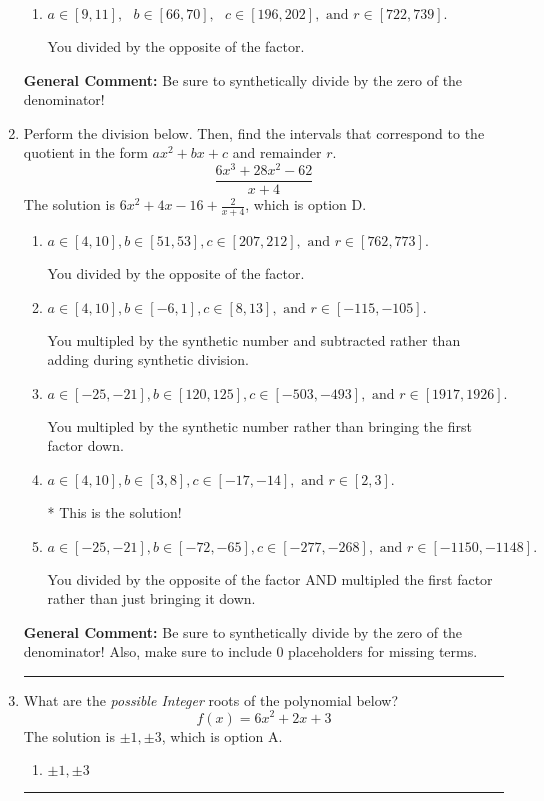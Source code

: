 \documentclass{extbook}[14pt]
\newcommand{\litem}[1]{\item #1

\rule{\textwidth}{0.4pt}}
\begin{document}
\begin{enumerate}
{\begin{enumerate}[label=\Alph*.]
* This is the solution!
\item \( a \in [9, 11], \text{   } b \in [66, 70], \text{   } c \in [196, 202], \text{   and   } r \in [722, 739]. \)

 You divided by the opposite of the factor.
\end{enumerate}

\textbf{General Comment:} Be sure to synthetically divide by the zero of the denominator!
}
\litem{
Perform the division below. Then, find the intervals that correspond to the quotient in the form $ax^2+bx+c$ and remainder $r$.
\[ \frac{6x^{3} +28 x^{2} -62}{x + 4} \]The solution is \( 6x^{2} +4 x -16 + \frac{2}{x + 4} \), which is option D.\begin{enumerate}[label=\Alph*.]
\item \( a \in [4, 10], b \in [51, 53], c \in [207, 212], \text{ and } r \in [762, 773]. \)

 You divided by the opposite of the factor.
\item \( a \in [4, 10], b \in [-6, 1], c \in [8, 13], \text{ and } r \in [-115, -105]. \)

 You multipled by the synthetic number and subtracted rather than adding during synthetic division.
\item \( a \in [-25, -21], b \in [120, 125], c \in [-503, -493], \text{ and } r \in [1917, 1926]. \)

 You multipled by the synthetic number rather than bringing the first factor down.
\item \( a \in [4, 10], b \in [3, 8], c \in [-17, -14], \text{ and } r \in [2, 3]. \)

* This is the solution!
\item \( a \in [-25, -21], b \in [-72, -65], c \in [-277, -268], \text{ and } r \in [-1150, -1148]. \)

 You divided by the opposite of the factor AND multipled the first factor rather than just bringing it down.
\end{enumerate}

\textbf{General Comment:} Be sure to synthetically divide by the zero of the denominator! Also, make sure to include 0 placeholders for missing terms.
}
\litem{
What are the \textit{possible Integer} roots of the polynomial below?
\[ f(x) = 6x^{2} +2 x + 3 \]The solution is \( \pm 1,\pm 3 \), which is option A.\begin{enumerate}[label=\Alph*.]
\item \( \pm 1,\pm 3 \)


\end{enumerate}}
\end{enumerate}
\end{document}
